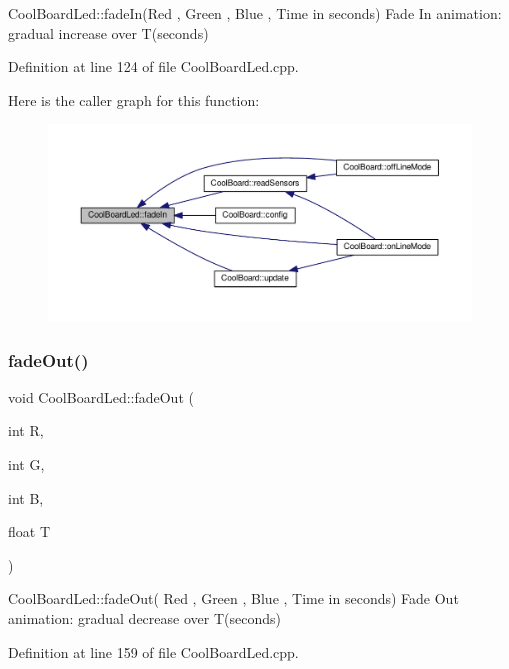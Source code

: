 Cool\+Board\+Led\+::fade\+In(\+Red , Green , Blue , Time in seconds) Fade In animation\+: gradual increase over T(seconds) 

Definition at line 124 of file Cool\+Board\+Led.\+cpp.

Here is the caller graph for this function\+:\nopagebreak
\begin{figure}[H]
\begin{center}
\leavevmode
\includegraphics[width=350pt]{class_cool_board_led_ab778f5e7bed0ab74e3906d82110493c3_icgraph}
\end{center}
\end{figure}
\mbox{\label{class_cool_board_led_a93d545679237e8cc858324367149775c}} 
\subsubsection{\texorpdfstring{fade\+Out()}{fadeOut()}}
{\footnotesize\ttfamily void Cool\+Board\+Led\+::fade\+Out (\begin{DoxyParamCaption}\item[{int}]{R,  }\item[{int}]{G,  }\item[{int}]{B,  }\item[{float}]{T }\end{DoxyParamCaption})}

Cool\+Board\+Led\+::fade\+Out( Red , Green , Blue , Time in seconds) Fade Out animation\+: gradual decrease over T(seconds) 

Definition at line 159 of file Cool\+Board\+Led.\+cpp.

